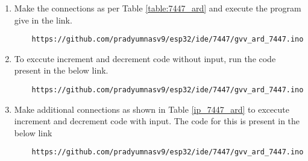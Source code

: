 \begin{enumerate}
\item Make the connections as per Table \ref{table:7447_ard}  and execute the program give in the link.
\begin{lstlisting}
	https://github.com/pradyumnasv9/esp32/ide/7447/gvv_ard_7447.ino
\end{lstlisting}
\begin{table}[H]
\centering

\caption{}
\label{table:7447_ard}
\end{table}
\item To exccute increment and decrement code without input, run the code present in the below link.
\begin{lstlisting}
	https://github.com/pradyumnasv9/esp32/ide/7447/gvv_ard_7447.ino
\end{lstlisting}
\item Make additional connections as shown in Table \ref{ip_7447_ard} to excecute increment and decrement code with input. The code for this is present in the below link
\begin{lstlisting}
	https://github.com/pradyumnasv9/esp32/ide/7447/gvv_ard_7447.ino
\end{lstlisting}
\begin{table}[H]
\centering

\caption{}
\label{table:ip_7447_ard}
\end{table}
\end{enumerate}
